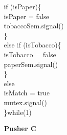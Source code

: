{\begin{minipage}[t]{.29\linewidth}
{\begin{minipage}[t]{\linewidth}
        \hspace*{20pt}if (isPaper)\{\\
        \hspace*{30pt}isPaper = false\\
        \hspace*{30pt}tobaccoSem.signal()\\
        \hspace*{20pt}\}\\
        \hspace*{20pt}else if (isTobacco)\{\\
        \hspace*{30pt}isTobacco = false\\
        \hspace*{30pt}paperSem.signal()\\
        \hspace*{20pt}\}\\
        \hspace*{20pt}else\\
        \hspace*{30pt}isMatch = true\\
        \hspace*{10pt}mutex.signal()\\
    \}while(1)
    \end{minipage}
    }
\end{minipage}
\hfill
\begin{minipage}[t]{.29\linewidth}
    \begin{center}
        {\bfseries Pusher C}
    \end{center}
\end{minipage}}
